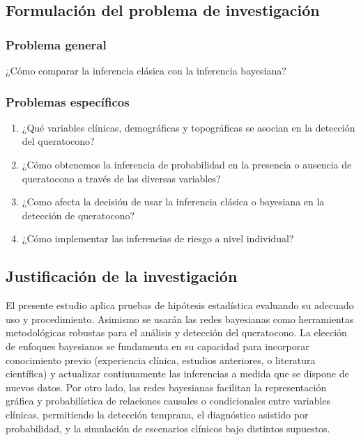 \subsection{Formulación del problema de investigación}
\subsubsection{Problema general}
¿Cómo comparar la inferencia clásica con la inferencia bayesiana?

\subsubsection{Problemas específicos}
\begin{enumerate}
\item ¿Qué variables clínicas, demográficas y topográficas se asocian en la detección del queratocono?
\item ¿Cómo obtenemos la inferencia de probabilidad en la presencia o ausencia de queratocono a través de las diversas variables?
\item ¿Como afecta la decisión de usar la inferencia clásica o bayesiana en la detección de queratocono?
\item ¿Cómo implementar las inferencias de riesgo a nivel individual?
\end{enumerate}

\subsection{Justificación de la investigación}
El presente estudio aplica pruebas de hipótesis estadística evaluando su adecuado uso y procedimiento. Asimismo se usarán las redes bayesianas como herramientas metodológicas robustas para el análisis y detección del queratocono. La elección de enfoques bayesianos se fundamenta en su capacidad para incorporar conocimiento previo (experiencia clínica, estudios anteriores, o literatura científica) y actualizar continuamente las inferencias a medida que se dispone de nuevos datos. Por otro lado, las redes bayesianas facilitan la representación gráfica y probabilística de relaciones causales o condicionales entre variables clínicas, permitiendo la detección temprana, el diagnóstico asistido por probabilidad, y la simulación de escenarios clínicos bajo distintos supuestos.

